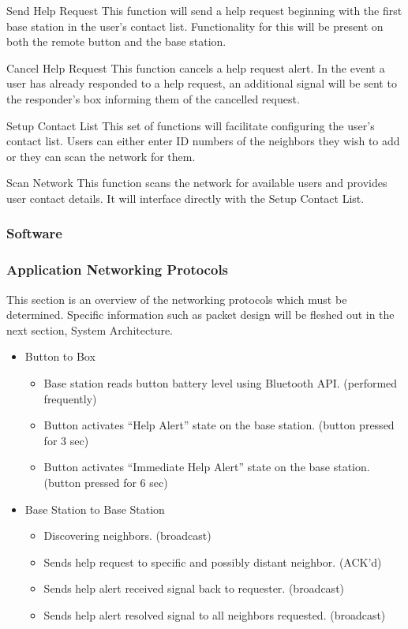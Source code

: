 \documentclass[journal,compsoc]{IEEEtran}
\begin{document}
\begin{LaTeXdescription}
\item[Send Help Request] This function will send a help request beginning with the first base station in the user’s contact list. Functionality for this will be present on both the remote button and the base station.
\item[Cancel Help Request] This function cancels a help request alert. In the event a user has already responded to a help request, an additional signal will be sent to the responder’s box informing them of the cancelled request.
\item[Setup Contact List] This set of functions will facilitate configuring the user’s contact list.  Users can either enter ID numbers of the neighbors they wish to add or they can scan the network for them.
\item[Scan Network] This function scans the network for available users and provides user contact details. It will interface directly with the Setup Contact List.
\end{LaTeXdescription}

\subsubsection{Software}

\subsubsection{Application Networking Protocols}

This section is an overview of the networking protocols which must be determined.  Specific information such as packet design will be fleshed out in the next section, System Architecture.

\begin{itemize}
  \item Button to Box
    \begin{itemize}
      \item Base station reads button battery level using Bluetooth API. (performed frequently)
      \item Button activates “Help Alert” state on the base station. (button pressed for 3 sec)
      \item Button activates “Immediate Help Alert” state on the base station. (button pressed for 6 sec)
    \end{itemize}
  \item Base Station to Base Station
    \begin{itemize}
      \item Discovering neighbors. (broadcast)
      \item Sends help request to specific and possibly distant neighbor. (ACK’d)
      \item Sends help alert received signal back to requester. (broadcast)
      \item Sends help alert resolved signal to all neighbors requested. (broadcast)
    \end{itemize}
\end{itemize}
\end{document}
